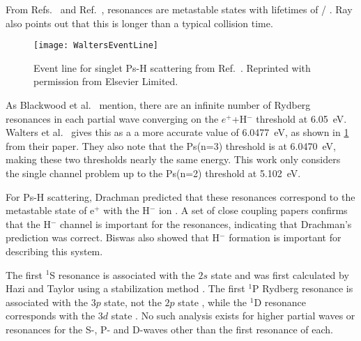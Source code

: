 \documentclass[Dissertation.tex]{subfiles}
\begin{document}
From Refs.~\cite{Ray2006,Ray2007} and Ref.~\cite[p.599]{Bransden2003}, resonances
are metastable states with lifetimes of
\beq
\tau \approx \hbar / \Gamma.
\eeq
Ray also points out that this is longer than a typical collision time.

\begin{figure}[H]
	\centering
	\texttt{[image: WaltersEventLine]}
	\caption[Event line for singlet Ps-H scattering]{Event line for singlet Ps-H scattering
from Ref.~\cite{Walters2004}. Reprinted with permission from Elsevier Limited.}
	\label{fig:WaltersEventLine}
\end{figure}

As Blackwood et al.\ \cite{Blackwood2002} mention, there are an infinite 
number of Rydberg resonances in each partial wave converging on the $e^+$+H$^-$
threshold at \SI{6.05}{eV}. Walters et al.\ \cite{Walters2004} gives this as a
a more accurate value of \SI{6.0477}{eV}, as shown in \cref{fig:WaltersEventLine}
from their paper. They also note that the Ps(n=3)
threshold is at \SI{6.0470}{eV}, making these two thresholds nearly the same
energy. This work only considers the single channel problem up to the Ps(n=2)
threshold at \SI{5.102}{eV}.

For Ps-H scattering, Drachman predicted that these resonances correspond to 
the metastable state of e$^+$ with the H$^-$ ion \cite{Drachman1979}. A set 
of close coupling papers \cite{Blackwood2002,Blackwood2002b,Walters2004} 
confirms that the H$^-$ channel is important for the resonances, indicating 
that Drachman's prediction was correct. Biswas \cite{Biswas2001} also showed 
that H$^-$ formation is important for describing this system.

The first $^1$S resonance is associated with the $2s$ state \cite{DiRienzi2002b} 
and was first calculated by Hazi and Taylor using a stabilization method
\cite{Hazi1970}. The first $^1$P Rydberg resonance is associated with the $3p$ 
state, not the $2p$ state \cite{DiRienzi2002b}, while the $^1$D resonance 
corresponds with the $3d$ state \cite{DiRienzi2002a}. No such analysis exists
for higher partial waves or resonances for the S-, P- and D-waves other
than the first resonance of each.


\biblio
\end{document}
